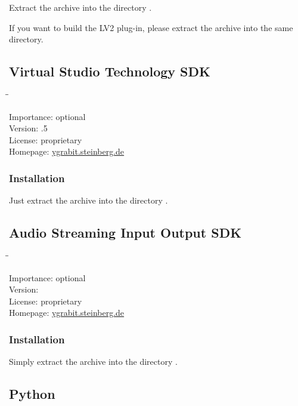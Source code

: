 Extract the archive into the directory .

If you want to build the LV2 plug-in, please extract the archive
 into the same directory.

\subsection{Virtual Studio Technology SDK}

\begin{tabbing}
  \hspace*{6em}\=\=\kill

  Importance:  \> optional \\
  Version:     .5 \\
  License:     \> proprietary \\
  Homepage:    \> \href{http://ygrabit.steinberg.de/}{ygrabit.steinberg.de}
\end{tabbing}

\subsubsection{Installation}

Just extract the archive into the directory
.

\subsection{Audio Streaming Input Output SDK}

\begin{tabbing}
  \hspace*{6em}\=\=\kill

  Importance:  \> optional \\
  Version:      \\
  License:     \> proprietary \\
  Homepage:    \> \href{http://ygrabit.steinberg.de/}{ygrabit.steinberg.de}
\end{tabbing}

\subsubsection{Installation}

Simply extract the archive into the directory
.

\subsection{Python}

